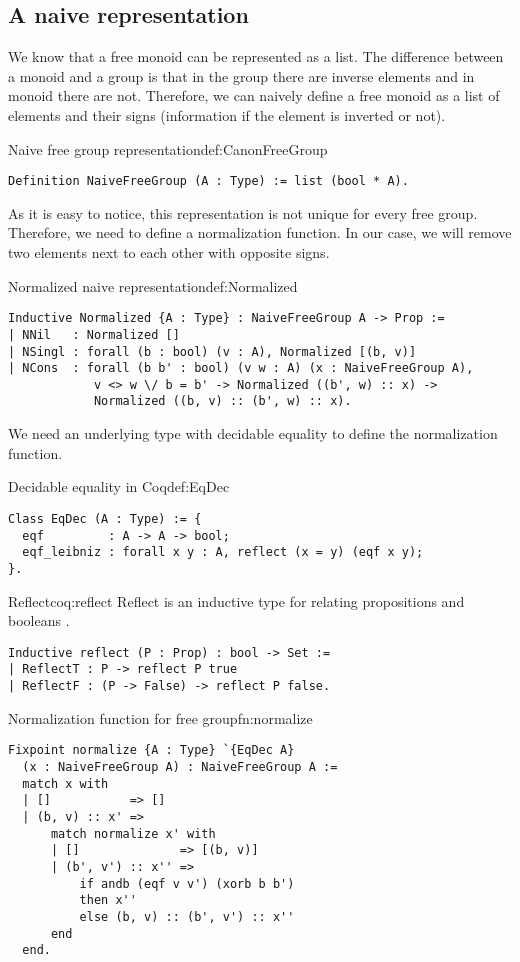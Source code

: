 \subsection{A naive representation}
We know that a free monoid can be represented as a list. The difference between a monoid and a group is that in the group there are inverse elements and in monoid there are not. Therefore, we can naively define a free monoid as a list of elements and their signs (information if the element is inverted or not).
\begin{defi}{Naive free group representation}{def:CanonFreeGroup}
\begin{verbatim}
Definition NaiveFreeGroup (A : Type) := list (bool * A).
\end{verbatim}
\end{defi}
As it is easy to notice, this representation is not unique for every free group. Therefore, we need to define a normalization function. In our case, we will remove two elements next to each other with opposite signs.
\begin{defi}{Normalized naive representation}{def:Normalized}
\begin{verbatim}
Inductive Normalized {A : Type} : NaiveFreeGroup A -> Prop :=
| NNil   : Normalized []
| NSingl : forall (b : bool) (v : A), Normalized [(b, v)]
| NCons  : forall (b b' : bool) (v w : A) (x : NaiveFreeGroup A), 
            v <> w \/ b = b' -> Normalized ((b', w) :: x) ->
            Normalized ((b, v) :: (b', w) :: x).
\end{verbatim}
\end{defi}
We need an underlying type with decidable equality to define the normalization function.
\begin{defi}{Decidable equality in Coq}{def:EqDec}
\begin{verbatim}
Class EqDec (A : Type) := { 
  eqf         : A -> A -> bool;
  eqf_leibniz : forall x y : A, reflect (x = y) (eqf x y);
}.
\end{verbatim}
\end{defi}
\begin{coq}{Reflect}{coq:reflect}
Reflect is an inductive type for
relating propositions and booleans \cite{coqDoc}.
\begin{verbatim}
Inductive reflect (P : Prop) : bool -> Set :=
| ReflectT : P -> reflect P true
| ReflectF : (P -> False) -> reflect P false.
\end{verbatim}
\end{coq}
\begin{func}{Normalization function for free group}{fn:normalize}
\begin{verbatim}
Fixpoint normalize {A : Type} `{EqDec A} 
  (x : NaiveFreeGroup A) : NaiveFreeGroup A :=
  match x with
  | []           => []
  | (b, v) :: x' => 
      match normalize x' with
      | []              => [(b, v)]
      | (b', v') :: x'' => 
          if andb (eqf v v') (xorb b b')
          then x''
          else (b, v) :: (b', v') :: x''
      end
  end.
\end{verbatim}
\end{func}
